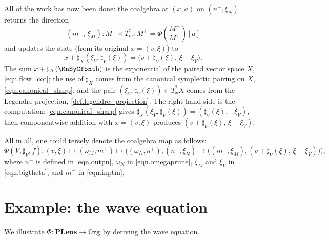 \documentclass[11pt, oneside, article]{memoir}
\theoremstyle{definition}
\theoremstyle{plain}
\newcommand{\Cat}[1]{\mathbf{#1}}%
\newcommand{\org}{{\mathbb{O}\Cat{rg}}}
\newcommand{\potlens}{\Cat{PLens}}
\newcommand{\inpt}[1]{#1^{-}}
\newcommand{\outp}[1]{#1^{+}}
\newcommand{\lensob}[1]{\binom{\inpt{#1}}{\outp{#1}}}%
\newcommand{\smallsquare}{\mbox{\MnSyCfont\symbol{"68}}}
\newcommand{\blank}{\mathord{\smallsquare}}
\begin{document}
All of the work has now been done: the coalgebra at $(x,a)$ on $(\inpt n,\xi_N)$ returns the direction
\[
(\inpt m,\,\xi_M):\inpt M\times T^*_{\outp m}\outp M=\Phi\lensob M[a]
\]
and updates the state (from its original $x=(v,\xi)$) to
\begin{equation}\label{eqn.state_update}
x+\sharp_X(\xi_V,\sharp_V(\xi))=\bigl(v+\sharp_V(\xi),\,\xi-\xi_V\bigr).
\end{equation}
The sum $x+\sharp_X(\blank)$ is the exponential of the paired vector space $X$, \eqref{eqn.flow_cot}; the use of $\sharp_X$ comes from the canonical symplectic pairing on $X$, \eqref{eqn.canonical_sharp}; and the pair $(\xi_V,\sharp_V(\xi))\in T^*_xX$ comes from the Legendre projection, \cref{def.legendre_projection}. The right-hand side is the computation: \eqref{eqn.canonical_sharp} gives $\sharp_X(\xi_V,\sharp_V(\xi))=(\sharp_V(\xi),-\xi_V)$, then componentwise addition with $x=(v,\xi)$ produces $(v+\sharp_V(\xi),\,\xi-\xi_V)$.

All in all, one could tersely denote the coalgebra map as follows:
\[
\Phi(V,\sharp_V,f)\colon 
(v,\xi)\mapsto
(\omega_M,\outp m)\mapsto
\Big(
	(\omega_N,\outp n),
	(\inpt n,\xi_N)\mapsto
	\big(
		(\inpt m,\xi_M),
		(v+\sharp_V(\xi),\,\xi-\xi_V)
	\big)
\Big),
\]
where $\outp n$ is defined in \eqref{eqn.outpn}, $\omega_N$ in \eqref{eqn.omegaprime}, $\xi_M$ and $\xi_V$ in \eqref{eqn.bigtheta}, and $\inpt m$ in \eqref{eqn.inptm}.

\chapter{Example: the wave equation}\label{sec.spring}

We illustrate $\Phi\colon\potlens\to\org$ by deriving the wave equation. 
\end{document}
